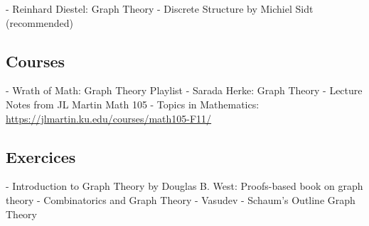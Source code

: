 \documentclass{article}
\begin{document}
- Reinhard Diestel: Graph Theory
- Discrete Structure by Michiel Sidt (recommended)

\subsection{Courses}%
\label{sub:Courses}

- Wrath of Math: Graph Theory Playlist
- Sarada Herke: Graph Theory
- Lecture Notes from JL Martin Math 105 - Topics in Mathematics:
\url{https://jlmartin.ku.edu/courses/math105-F11/}

\subsection{Exercices}%
\label{sub:Exercices}

- Introduction to Graph Theory by Douglas B. West: Proofs-based book on
graph theory
- Combinatorics and Graph Theory - Vasudev
- Schaum's Outline Graph Theory
\end{document}
